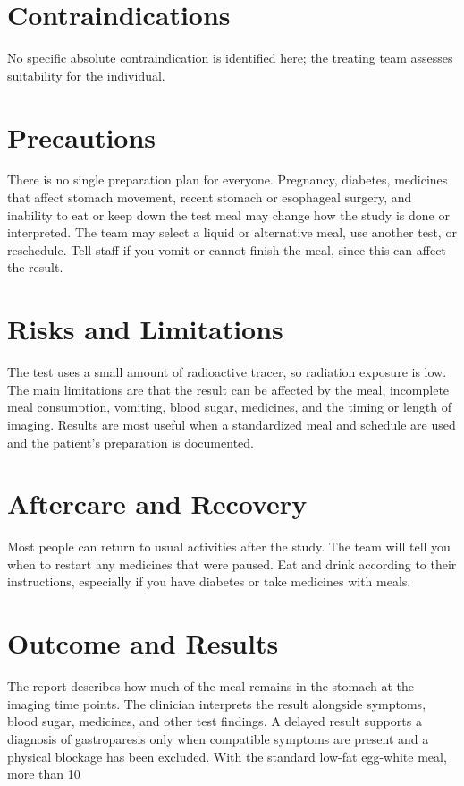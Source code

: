 \section*{Contraindications}
No specific absolute contraindication is identified here; the treating team assesses suitability for the individual.

\section*{Precautions}
There is no single preparation plan for everyone. Pregnancy, diabetes, medicines that affect stomach movement, recent stomach or esophageal surgery, and inability to eat or keep down the test meal may change how the study is done or interpreted. The team may select a liquid or alternative meal, use another test, or reschedule. Tell staff if you vomit or cannot finish the meal, since this can affect the result.

\section*{Risks and Limitations}
The test uses a small amount of radioactive tracer, so radiation exposure is low. The main limitations are that the result can be affected by the meal, incomplete meal consumption, vomiting, blood sugar, medicines, and the timing or length of imaging. Results are most useful when a standardized meal and schedule are used and the patient's preparation is documented.

\section*{Aftercare and Recovery}
Most people can return to usual activities after the study. The team will tell you when to restart any medicines that were paused. Eat and drink according to their instructions, especially if you have diabetes or take medicines with meals.

\section*{Outcome and Results}
The report describes how much of the meal remains in the stomach at the imaging time points. The clinician interprets the result alongside symptoms, blood sugar, medicines, and other test findings. A delayed result supports a diagnosis of gastroparesis only when compatible symptoms are present and a physical blockage has been excluded. With the standard low-fat egg-white meal, more than 10%

